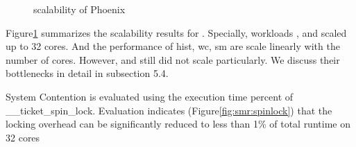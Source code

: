 \begin{figure}[htpb]
	\centering
	\caption{scalability of Phoenix}
	\label{fig:smr:scalability}
\end{figure}

Figure\ref{fig:smr:scalability} summarizes the scalability results for \myds.
Specially, workloads ,  and  scaled up to 32 cores.
And the performance of hist, wc, sm are scale linearly with the number of cores.
However,  and  still did not scale particularly. We discuss their bottlenecks in detail in subsection 5.4.


System Contention is evaluated using the execution time percent of \_\_ticket\_spin\_lock. 
Evaluation indicates (Figure\ref{fig:smr:spinlock}) that the locking overhead can be significantly reduced to less than 1\% of total runtime on 32 cores

